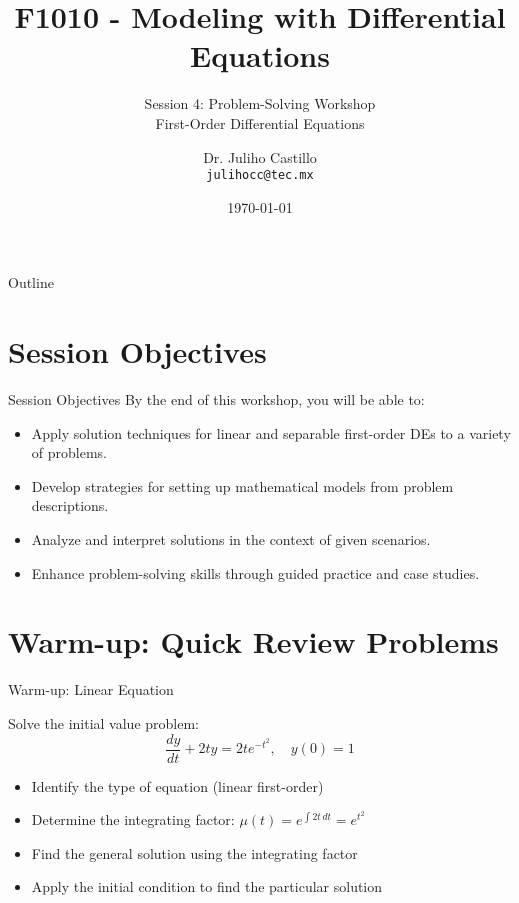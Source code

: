 \documentclass[10pt,aspectratio=169]{beamer}
\title{F1010 - Modeling with Differential Equations}
\subtitle{Session 4: Problem-Solving Workshop \\ First-Order Differential Equations}
\author{Dr. Juliho Castillo \\ \texttt{julihocc@tec.mx}}
\institute{Tec de Monterrey}
\date{\today}
\newcommand{\formula}[1]{\textit{#1}}
\begin{document}
\maketitle

\begin{frame}{Outline}
    \tableofcontents
\end{frame}

\section{Session Objectives}
\begin{frame}{Session Objectives}
    By the end of this workshop, you will be able to:
    \begin{itemize}
        \item Apply solution techniques for linear and separable first-order DEs to a variety of problems.
        \item Develop strategies for setting up mathematical models from problem descriptions.
        \item Analyze and interpret solutions in the context of given scenarios.
        \item Enhance problem-solving skills through guided practice and case studies.
    \end{itemize}
\end{frame}

\section{Warm-up: Quick Review Problems}
\begin{frame}{Warm-up: Linear Equation}
    \begin{problembox}
        Solve the initial value problem:
        \formula{\[ \frac{dy}{dt} + 2ty = 2te^{-t^2}, \quad y(0) = 1 \]}
    \end{problembox}
    
    \begin{solutionbox}
        \begin{itemize}
            \item Identify the type of equation (linear first-order)
            \item Determine the integrating factor: $\mu(t) = e^{\int 2t \, dt} = e^{t^2}$
            \item Find the general solution using the integrating factor
            \item Apply the initial condition to find the particular solution
        \end{itemize}
    \end{solutionbox}
\end{frame}
\end{document}
